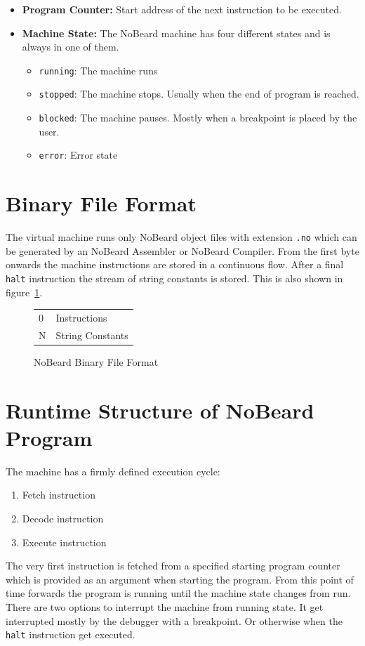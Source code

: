 \begin{itemize}
\item \textbf{Program Counter: }Start address of the next instruction to be executed.
\item \textbf{Machine State: }The NoBeard machine has four different states and is always in one of them. 
	\begin{itemize}
		\item \lstinline$running$: The machine runs
		\item \lstinline$stopped$: The machine stops. Usually when the end of program is reached.
		\item \lstinline$blocked$: The machine pauses. Mostly when a breakpoint is placed by the user.
		\item \lstinline$error$: Error state
	\end{itemize}
\end{itemize}

\section{Binary File Format}
The virtual machine runs only NoBeard object files with extension \lstinline$.no$ which can be generated by an NoBeard Assembler or NoBeard Compiler. From the first byte onwards the machine instructions are stored in a continuous flow. After a final \lstinline$halt$ instruction the stream of string constants is stored. This is also shown in figure~\ref{fig:binaryfileformat}.

\begin{figure}[h]
\begin{center}
\begin{tabular}{p{8em}|p{8em}|}
\cline{2-2}
\parbox[t][3em][t]{8em}{\hfill 0} & Instructions \\[3em] 
\parbox[b][2em][b]{8em}{\hfill N} & String Constants \\ 
\end{tabular}
\end{center}
\caption{NoBeard Binary File Format}\label{fig:binaryfileformat}
\end{figure}

\section{Runtime Structure of NoBeard Program}
The machine has a firmly defined execution cycle:
\begin{enumerate}
\item Fetch instruction
\item Decode instruction
\item Execute instruction
\end{enumerate}
The very first instruction is fetched from a specified starting program counter which is provided as an argument when starting the program. From this point of time forwards the program is running until the machine state changes from run. There are two options to interrupt the machine from running state. It get interrupted mostly by the debugger with a breakpoint. Or otherwise when the \lstinline$halt$ instruction get executed.
